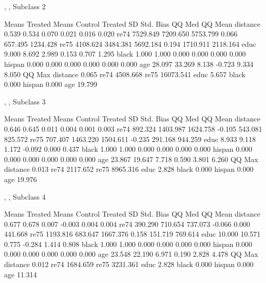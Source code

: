 \documentclass[oneside,letterpaper,titlepage]{article}
\begin{document}
\begin{enumerate}
\begin{Schunk}
\begin{Soutput}
, , Subclass 2

         Means Treated Means Control Treated SD Std. Bias    QQ Med   QQ Mean
distance         0.539         0.534      0.070     0.021     0.016     0.020
re74          7529.849      7209.650   5753.799     0.066   657.495  1234.428
re75          4108.624      3484.381   5692.184     0.194  1710.911  2118.164
educ             9.000         8.692      2.989     0.153     0.707     1.295
black            1.000         1.000      0.000     0.000     0.000     0.000
hispan           0.000         0.000      0.000     0.000     0.000     0.000
age             28.097        33.269      8.138    -0.723     9.334     8.050
            QQ Max
distance     0.065
re74      4508.668
re75     16073.541
educ         5.657
black        0.000
hispan       0.000
age         19.799

, , Subclass 3

         Means Treated Means Control Treated SD Std. Bias    QQ Med   QQ Mean
distance         0.646         0.645      0.011     0.004     0.001     0.003
re74           892.324      1403.987   1624.758    -0.105   543.081   825.572
re75           707.407      1463.220   1504.611    -0.235   291.168   944.259
educ             8.933         9.118      1.172    -0.092     0.000     0.437
black            1.000         1.000      0.000     0.000     0.000     0.000
hispan           0.000         0.000      0.000     0.000     0.000     0.000
age             23.867        19.647      7.718     0.590     3.801     6.260
            QQ Max
distance     0.013
re74      2117.652
re75      8965.316
educ         2.828
black        0.000
hispan       0.000
age         19.976

, , Subclass 4

         Means Treated Means Control Treated SD Std. Bias    QQ Med   QQ Mean
distance         0.677         0.678      0.007    -0.003     0.004     0.004
re74           390.290       710.654    737.073    -0.066     0.000   441.668
re75          1193.816       683.647   1667.376     0.158   151.719   769.614
educ            10.000        10.571      0.775    -0.284     1.414     0.808
black            1.000         1.000      0.000     0.000     0.000     0.000
hispan           0.000         0.000      0.000     0.000     0.000     0.000
age             23.548        22.190      6.971     0.190     2.828     4.478
            QQ Max
distance     0.012
re74      1684.659
re75      3231.361
educ         2.828
black        0.000
hispan       0.000
age         11.314


\end{Soutput}
\end{Schunk}
\end{enumerate}
\end{document}

